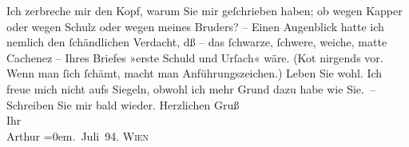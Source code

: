 \begin{ledgroupsized}[t]{13cm}
           \pstart
           Ich zerbreche mir den Kopf, warum Sie mir geſchrieben haben; ob wegen Kapper oder wegen Schulz oder wegen meines Bruders? – Einen Augenblick hatte ich nemlich den
               ſchändlichen Ver{\pb}dacht, dß – das ſchwarze, ſchwere,
               weiche, matte Cachenez – Ihres Briefes »erste Schuld und Urſach« wäre. (Ko{\geminationm}t nirgends vor. Wenn man ſich ſchämt, macht man
               Anführungszeichen.)\pend
           \pstart
           Leben Sie wohl. Ich freue {\pb}mich nicht aufs Siegeln,
               obwohl ich mehr Grund dazu habe wie Sie. –\pend
           \pstart
           Schreiben Sie mir bald wieder. Herzlichen Gruß{\\[\baselineskip]}Ihr{\\[\baselineskip]}\spacefill\mbox{Arthur}\pend
           \leftskip=0em{}. Juli 94. \textsc{Wien}\pend
           
         
         \endnumbering{}\end{ledgroupsized}  \newcommand{\dateiname}{L00343}\newcommand{\titel}{Arthur Schnitzler an Richard Beer-Hofmann, 2. 7. 1894}\newcommand{\editorInnen}{ Martin Anton Müller und Gerd-Hermann Susen}
      